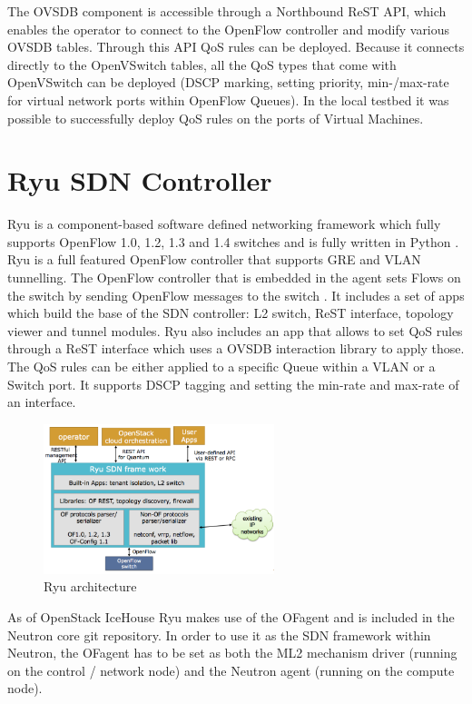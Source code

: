 The OVSDB component is accessible through a Northbound ReST API, which enables the operator to connect to the OpenFlow controller and modify various OVSDB tables. Through this API QoS rules can be deployed. Because it connects directly to the OpenVSwitch tables, all the QoS types that come with OpenVSwitch can be deployed (DSCP marking, setting priority, min-/max-rate for virtual network ports within OpenFlow Queues). In the local testbed it was possible to successfully deploy QoS rules on the ports of Virtual Machines. 


\section{Ryu SDN Controller}

Ryu is a component-based software defined networking framework which fully supports OpenFlow 1.0, 1.2, 1.3 and 1.4 switches and is fully written in Python \cite{ryu-start}. Ryu is a full featured OpenFlow controller that supports GRE and VLAN tunnelling. The OpenFlow controller that is embedded in the agent sets Flows on the switch by sending OpenFlow messages to the switch \cite{ryu-comparison}. It includes a set of apps which build the base of the SDN controller: L2 switch, ReST interface, topology viewer and tunnel modules. Ryu also includes an app that allows to set QoS rules through a ReST interface which uses a OVSDB interaction library to apply those. The QoS rules can be either applied to a specific Queue within a VLAN or a Switch port. It supports DSCP tagging and setting the min-rate and max-rate of an interface.

\begin{figure}[H]
\centering
\includegraphics[width=0.6\textwidth]{images/sota/ryu_architecture.png}
\caption{Ryu architecture}
\end{figure}


As of OpenStack IceHouse Ryu makes use of the OFagent and is included in the Neutron core git repository. In order to use it as the SDN framework within Neutron, the OFagent  has to be set as both the ML2 mechanism driver (running on the control / network node) and the Neutron agent (running on the compute node). 


